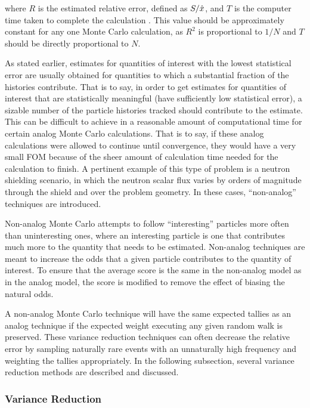 \noindent where $R$ is the estimated relative error, defined as $S/\hat{x}$, and $T$ is
the computer time taken to complete the calculation \cite{mcnp}. This value should be 
approximately constant for any one Monte Carlo calculation, as $R^2$ is 
proportional to $1/N$ and $T$ should be directly proportional to $N$.

As stated earlier, estimates for quantities of interest with the lowest statistical error
are usually obtained for quantities to which a substantial fraction of the histories 
contribute. That is to say, in order to get estimates for quantities of interest that 
are statistically meaningful (have sufficiently low statistical error), a sizable number of 
the particle histories tracked should contribute to the estimate. This can be 
difficult to achieve in a reasonable amount of computational time for certain analog 
Monte Carlo calculations. That is to say, if these analog calculations were allowed 
to continue until convergence, they would have a very small FOM because of the sheer
amount of calculation time needed for the calculation to finish. A pertinent example 
of this type of problem is a neutron shielding scenario, in which the neutron scalar 
flux varies by orders of magnitude through the shield and over the problem geometry. 
In these cases, ``non-analog'' techniques are introduced.

Non-analog Monte Carlo attempts to follow ``interesting'' particles more often 
than uninteresting ones, where an interesting particle is one that contributes much more
to the quantity that needs to be estimated. Non-analog techniques are 
meant to increase the odds that a given particle contributes to the quantity of
interest. To ensure that the average score is the same in the non-analog model as in 
the analog model, the score is modified to remove the effect of biasing the natural 
odds.

A non-analog Monte Carlo technique will have the same expected tallies as an 
analog technique if the expected weight executing any given random walk is preserved.
These variance reduction techniques can often decrease the relative error by 
sampling naturally rare events with an unnaturally high frequency and weighting the 
tallies appropriately. In the following subsection, several variance reduction methods
are described and discussed.

\subsubsection{Variance Reduction}

